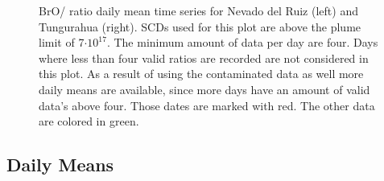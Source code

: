 \documentclass  [
  paper    = a4,
  BCOR     = 10mm,
  twoside,
  fontsize = 12pt,
  fleqn,
  toc      = bibnumbered,
  toc      = listofnumbered,
  numbers  = noendperiod,
  headings = normal,
  listof   = leveldown,
  version  = 3.03
]                                       {scrreprt}
\begin{document}
	\begin{figure}
		\caption{
			BrO/ ratio daily mean time series for Nevado del Ruiz (left) and Tungurahua (right).  SCDs used for this plot are above the plume limit of 7$\cdot 10^{17}$. The minimum amount of data per day are four. Days where less than four valid ratios are recorded are not considered in this plot. As a result of using the contaminated data as well more daily means are available, since more days have an amount of valid data's above four. Those dates are marked with red. The other data are colored in green.}
		\label{fig:dailymeanstungurahua}
	\end{figure}
	\subsection*{Daily Means}
	
\end{document}
